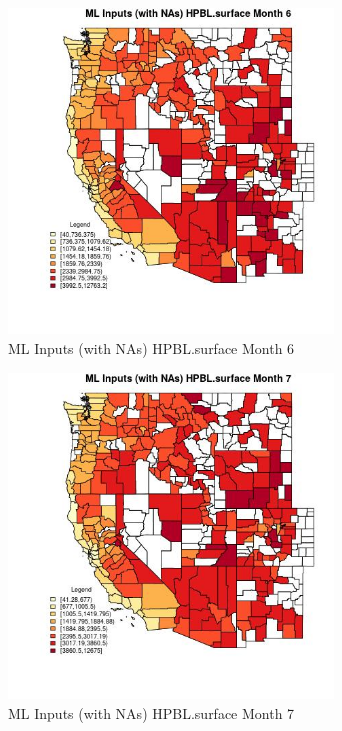 \begin{figure} 
\centering  
\includegraphics[width=0.77\textwidth]{Code_Outputs/Report_ML_input_PM25_Step4_part_f_de_duplicated_aves_prioritize_24hr_obswNAs_CountyHPBLsurfacemedianMonth6.jpg} 
\caption{\label{fig:Report_ML_input_PM25_Step4_part_f_de_duplicated_aves_prioritize_24hr_obswNAsCountyHPBLsurfacemedianMonth6}ML Inputs (with NAs) HPBL.surface Month 6} 
\end{figure} 
 

\clearpage 

\begin{figure} 
\centering  
\includegraphics[width=0.77\textwidth]{Code_Outputs/Report_ML_input_PM25_Step4_part_f_de_duplicated_aves_prioritize_24hr_obswNAs_CountyHPBLsurfacemedianMonth7.jpg} 
\caption{\label{fig:Report_ML_input_PM25_Step4_part_f_de_duplicated_aves_prioritize_24hr_obswNAsCountyHPBLsurfacemedianMonth7}ML Inputs (with NAs) HPBL.surface Month 7} 
\end{figure} 
 

